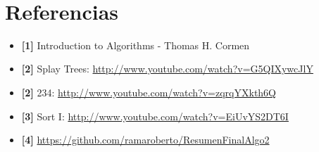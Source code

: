 \documentclass[10pt, a4paper]{report}
\begin{document}
~

\section*{Referencias}

\begin{itemize}
 \item \textbf{[1]} Introduction to Algorithms - Thomas H. Cormen
 \item \textbf{[2]} Splay Trees: \url{http://www.youtube.com/watch?v=G5QIXywcJlY}
 \item \textbf{[2]} 234: \url{http://www.youtube.com/watch?v=zqrqYXkth6Q}
 \item \textbf{[3]} Sort I: \url{http://www.youtube.com/watch?v=EiUvYS2DT6I}
 \item \textbf{[4]} \url{https://github.com/ramaroberto/ResumenFinalAlgo2}
\end{itemize}


\tableofcontents



\newpage



\newpage



\newpage


\end{document}
